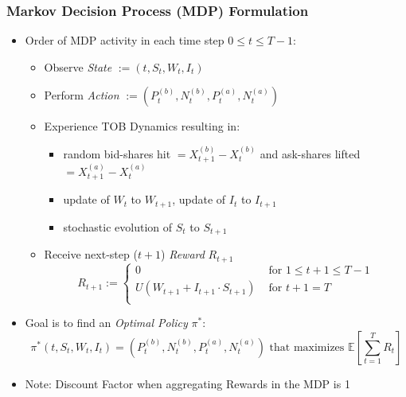 \documentclass[handout]{beamer}
\begin{document}
\begin{frame}
\frametitle{Markov Decision Process (MDP) Formulation}
\pause
\begin{itemize}[<+->]
\item Order of MDP activity in each time step $0 \leq t \leq T-1$:
\begin{itemize}
\item Observe {\em State} $:= (t, S_t, W_t, I_t)$
\item Perform {\em Action} $:= (P_t^{(b)}, N_t^{(b)}, P_t^{(a)}, N_t^{(a)})$
\item Experience TOB Dynamics resulting in:
\begin{itemize}
\item random bid-shares hit $=X_{t+1}^{(b)} - X_t^{(b)}$ and ask-shares lifted $=X_{t+1}^{(a)} - X_t^{(a)}$
\item update of $W_t$ to $W_{t+1}$, update of $I_t$ to $I_{t+1}$
\item stochastic evolution of $S_t$ to $S_{t+1}$
\end{itemize}
\item Receive next-step ($t+1$) {\em Reward} $R_{t+1}$
$$
R_{t+1} :=
\begin{cases}
0 & \text{ for }1 \leq t+1 \leq T-1 \\
U(W_{t+1} + I_{t+1} \cdot S_{t+1}) & \text{ for } t+1 = T \\
\end{cases}
$$
\end{itemize}
\item Goal is to find an {\em Optimal Policy} $\pi^*$:
$$\pi^*(t, S_t, W_t, I_t) = (P_t^{(b)}, N_t^{(b)}, P_t^{(a)}, N_t^{(a)}) \mbox{ that maximizes } \mathbb{E}[\sum_{t=1}^T R_t]$$
\item Note: Discount Factor when aggregating Rewards in the MDP is 1
\end{itemize}
\end{frame}
\end{document}
